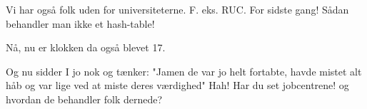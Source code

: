 \documentclass[a4paper,11pt]{article}
\begin{document}
\begin{sketch}
	Vi har også folk uden for universiteterne. F. eks. RUC.
	For sidste gang! Sådan behandler man ikke et hash-table!

    Nå, nu er klokken da også blevet 17.

    Og nu sidder I jo nok og tænker:
   "Jamen de var jo helt fortabte, havde mistet alt håb og var lige ved at miste deres værdighed"
	Hah! Har du set jobcentrene! og hvordan de behandler folk dernede?
\end{sketch}
\end{document}
